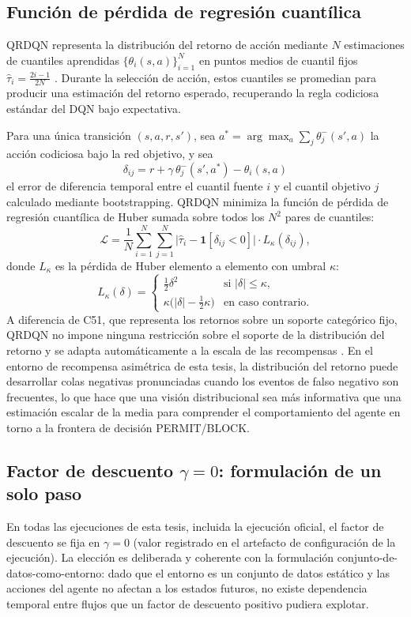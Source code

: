 \subsection{Función de pérdida de regresión cuantílica}
QRDQN representa la distribución del retorno de acción mediante $N$ estimaciones de cuantiles aprendidas $\{\theta_i(s, a)\}_{i=1}^{N}$ en puntos medios de cuantil fijos $\hat{\tau}_i = \frac{2i-1}{2N}$ \parencite{Dabney2018QRDQN}. Durante la selección de acción, estos cuantiles se promedian para producir una estimación del retorno esperado, recuperando la regla codiciosa estándar del DQN bajo expectativa.

Para una única transición $(s, a, r, s')$, sea $a^* = \arg\max_a \sum_j \theta_j^-(s', a)$ la acción codiciosa bajo la red objetivo, y sea
\[
    \delta_{ij} = r + \gamma\,\theta_j^-(s', a^*) - \theta_i(s, a)
\]
el error de diferencia temporal entre el cuantil fuente $i$ y el cuantil objetivo $j$ calculado mediante bootstrapping. QRDQN minimiza la función de pérdida de regresión cuantílica de Huber sumada sobre todos los $N^2$ pares de cuantiles:
\[
    \mathcal{L} = \frac{1}{N}\sum_{i=1}^{N}\sum_{j=1}^{N}
        \bigl|\hat{\tau}_i - \mathbf{1}[\delta_{ij} < 0]\bigr|\cdot L_\kappa(\delta_{ij}),
\]
donde $L_\kappa$ es la pérdida de Huber elemento a elemento con umbral $\kappa$:
\[
    L_\kappa(\delta) = \begin{cases} \tfrac{1}{2}\delta^2 & \text{si } |\delta| \leq \kappa, \\ \kappa\bigl(|\delta| - \tfrac{1}{2}\kappa\bigr) & \text{en caso contrario.}\end{cases}
\]
A diferencia de C51, que representa los retornos sobre un soporte categórico fijo, QRDQN no impone ninguna restricción sobre el soporte de la distribución del retorno y se adapta automáticamente a la escala de las recompensas \parencite{Bellemare2017DistributionalRL}. En el entorno de recompensa asimétrica de esta tesis, la distribución del retorno puede desarrollar colas negativas pronunciadas cuando los eventos de falso negativo son frecuentes, lo que hace que una visión distribucional sea más informativa que una estimación escalar de la media para comprender el comportamiento del agente en torno a la frontera de decisión PERMIT/BLOCK.

\subsection{Factor de descuento $\gamma = 0$: formulación de un solo paso}
En todas las ejecuciones de esta tesis, incluida la ejecución oficial, el factor de descuento se fija en $\gamma = 0$ (valor registrado en el artefacto de configuración de la ejecución). La elección es deliberada y coherente con la formulación conjunto-de-datos-como-entorno: dado que el entorno es un conjunto de datos estático y las acciones del agente no afectan a los estados futuros, no existe dependencia temporal entre flujos que un factor de descuento positivo pudiera explotar.

